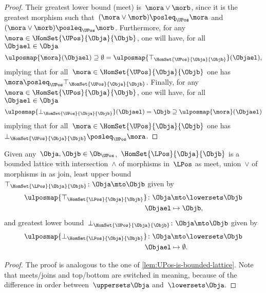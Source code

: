 \begin{proof}
    Their greatest lower bound (meet) is~$\mora \vee \morb$, since it is the greatest morphism such that~$(\mora \vee \morb)\posleq_\UPos \mora $ and~$(\mora \vee \morb)\posleq_\UPos \morb$.
      Furthermore, for any~$\mora \in \HomSet{\UPos}{\Obja}{\Objb}$, one will have, for all~$\Objael \in \Obja$
      \begin{equation*}
          \ulposmap{\mora}(\Objael) \supseteq \emptyset=\ulposmap{\top_{\HomSet{\UPos}{\Obja}{\Objb}}}(\Objael),
      \end{equation*}
    implying that for all~$\mora \in \HomSet{\UPos}{\Obja}{\Objb}$ one has~$\mora \posleq_\UPos \top_{\HomSet{\UPos}{\Obja}{\Objb}}$.
      Finally, for any~$\mora \in \HomSet{\UPos}{\Obja}{\Objb}$, one will have, for all~$\Objael \in \Obja$
      \begin{equation*}
          \ulposmap{\bot_{\HomSet{\UPos}{\Obja}{\Objb}}}(\Objael)=\Objb \supseteq \ulposmap{\mora}(\Objael)
      \end{equation*}
    implying that for all~$\mora \in \HomSet{\UPos}{\Obja}{\Objb}$ one has~$\bot_{\HomSet{\UPos}{\Obja}{\Objb}}\posleq_\UPos \mora$.
  \end{proof}

\begin{lemma}\label{lem:LPos-is-bounded-lattice}
    Given any~$\Obja,\Objb\in \Ob_\UPos$,~$\HomSet{\LPos}{\Obja}{\Objb}$ is a bounded lattice with intersection~$\wedge$ of morphisms in~$\LPos$ as meet, union~$\vee$ of morphisms in \LPos as join, least upper bound~$\top_{\HomSet{\LPos}{\Obja}{\Objb}}\colon \Obja \mto \Objb$ given by
    \begin{equation*}
        \begin{aligned}
        \ulposmap{\top_{\HomSet{\LPos}{\Obja}{\Objb}}}\colon \Obja &\mto \lowersets \Objb\\
            \Objael &\mapsto \Objb,
        \end{aligned}
    \end{equation*}
    and greatest lower bound~$\bot_{\HomSet{\UPos}{\Obja}{\Objb}}\colon \Obja \mto \Objb$ given by
    \begin{equation*}
        \begin{aligned}
        \ulposmap{\bot_{\HomSet{\LPos}{\Obja}{\Objb}}}\colon \Obja &\mto \lowersets \Objb\\
            \Objael &\mapsto \emptyset.
        \end{aligned}
    \end{equation*}
  \end{lemma}
\begin{proof}
    The proof is analogous to the one of \cref{lem:UPos-is-bounded-lattice}.
    Note that meets/joins and top/bottom are switched in meaning, because of the difference in order between~$\uppersets \Obja$ and~$\lowersets \Obja$.
\end{proof}
  
